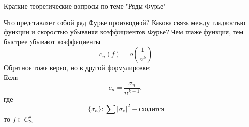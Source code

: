 \documentclass{article}
\begin{document}
\begin{section}{Краткие теоретические вопросы по теме "Ряды Фурье"}
\begin{subsection}{Что представляет собой ряд Фурье производной? Какова связь между гладкостью функции и скоростью убывания коэффициентов Фурье?}
Чем глаже функция, тем быстрее убывают коэффициенты 
\[ c_n(f) = o\left(\frac{1}{n^k}\right)\]
Обратное тоже верно, но в другой формулировке:\\
Если
\[ c_n = \frac{\sigma_n}{n^{k+1}}, \]
где \[ \{\sigma_n\}: \sum |\sigma_n|^2 - \text{сходится}  \]
то $f \in C_{2\pi}^k$
\end{subsection}

\end{section}
\end{document}
